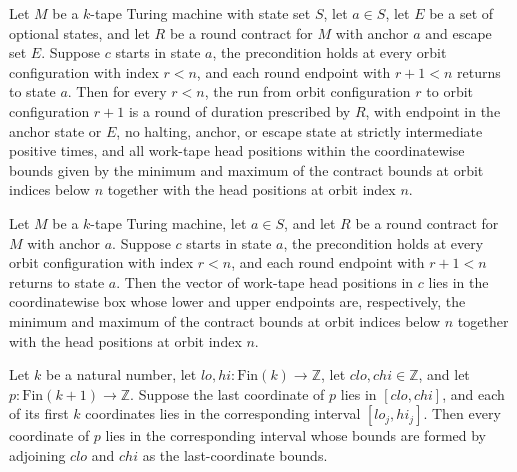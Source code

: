 \begin{theorem}
\label{Turing.RoundContract.orbit_round}
\leanok
{}
Let $M$ be a $k$-tape Turing machine with state set $S$, let $a\in S$, let $E$ be a set
of optional states, and let $R$ be a round contract for $M$ with anchor $a$ and escape
set $E$. Suppose $c$ starts in state $a$, the precondition holds at every orbit
configuration with index $r<n$, and each round endpoint with $r+1<n$ returns to state
$a$. Then for every $r<n$, the run from orbit configuration $r$ to orbit configuration
$r+1$ is a round of duration prescribed by $R$, with endpoint in the anchor state or
$E$, no halting, anchor, or escape state at strictly intermediate positive times, and
all work-tape head positions within the coordinatewise bounds given by the minimum and
maximum of the contract bounds at orbit indices below $n$ together with the head
positions at orbit index $n$.
\end{theorem}

\begin{theorem}
\label{Turing.RoundContract.orbit_start}
\leanok
{}
Let $M$ be a $k$-tape Turing machine, let $a\in S$, and let $R$ be a round contract for
$M$ with anchor $a$. Suppose $c$ starts in state $a$, the precondition holds at every
orbit configuration with index $r<n$, and each round endpoint with $r+1<n$ returns to
state $a$. Then the vector of work-tape head positions in $c$ lies in the coordinatewise
box whose lower and upper endpoints are, respectively, the minimum and maximum of the
contract bounds at orbit indices below $n$ together with the head positions at orbit
index $n$.
\end{theorem}

\begin{theorem}
\label{Turing.headBox_lastCases}
\leanok
{}
Let $k$ be a natural number, let $lo,hi:\mathrm{Fin}(k)\to\mathbb{Z}$, let
$clo,chi\in\mathbb{Z}$, and let $p:\mathrm{Fin}(k+1)\to\mathbb{Z}$. Suppose the last
coordinate of $p$ lies in $[clo,chi]$, and each of its first $k$ coordinates lies in the
corresponding interval $[lo_j,hi_j]$. Then every coordinate of $p$ lies in the
corresponding interval whose bounds are formed by adjoining $clo$ and $chi$ as the
last-coordinate bounds.
\end{theorem}

